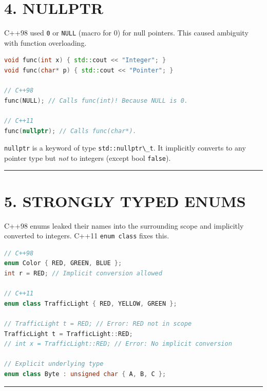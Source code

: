 \hypertarget{nullptr}{%
\section{4. NULLPTR}\label{nullptr}}

C++98 used \passthrough{\lstinline!0!} or \passthrough{\lstinline!NULL!}
(macro for 0) for null pointers. This caused ambiguity with function
overloading.

\begin{lstlisting}[language={C++}]
void func(int x) { std::cout << "Integer"; }
void func(char* p) { std::cout << "Pointer"; }

// C++98
func(NULL); // Calls func(int)! Because NULL is 0.

// C++11
func(nullptr); // Calls func(char*).
\end{lstlisting}

\passthrough{\lstinline!nullptr!} is a keyword of type
\passthrough{\lstinline!std::nullptr\_t!}. It implicitly converts to any
pointer type but \emph{not} to integers (except bool
\passthrough{\lstinline!false!}).

\begin{center}\rule{0.5\linewidth}{0.5pt}\end{center}

\hypertarget{strongly-typed-enums}{%
\section{5. STRONGLY TYPED ENUMS}\label{strongly-typed-enums}}

C++98 enums leaked their names into the surrounding scope and implicitly
converted to integers. C++11 \passthrough{\lstinline!enum class!} fixes
this.

\begin{lstlisting}[language={C++}]
// C++98
enum Color { RED, GREEN, BLUE };
int r = RED; // Implicit conversion allowed

// C++11
enum class TrafficLight { RED, YELLOW, GREEN };

// TrafficLight t = RED; // Error: RED not in scope
TrafficLight t = TrafficLight::RED;
// int x = TrafficLight::RED; // Error: No implicit conversion

// Explicit underlying type
enum class Byte : unsigned char { A, B, C };
\end{lstlisting}

\begin{center}\rule{0.5\linewidth}{0.5pt}\end{center}

